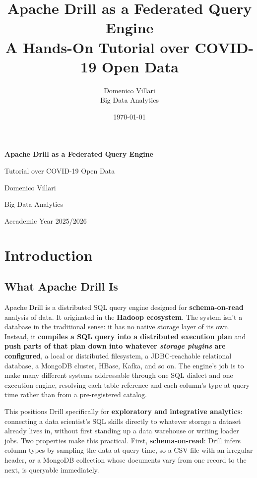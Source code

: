 \documentclass[11pt,a4paper]{article}
\title{\Huge\textbf{Apache Drill as a Federated Query Engine}\\[0.4em]
\Large A Hands-On Tutorial over COVID-19 Open Data}
\author{Domenico Villari\\\small Big Data Analytics}
\date{\today}
\begin{document}
\begin{titlepage}
\centering
\vspace*{3cm}
{\Huge\textbf{Apache Drill as a Federated Query Engine}\par}
\vspace{0.6cm}
{\Large  Tutorial over COVID-19 Open Data\par}
\vspace{2cm}
{\large Domenico Villari\par}
{\normalsize Big Data Analytics \par}
\vspace{3cm}
{\normalsize Accademic Year 2025/2026\par}
\vfill

\end{titlepage}

\tableofcontents
\newpage






\section{Introduction}
\label{sec:intro}

\subsection{What Apache Drill Is}

Apache Drill is a distributed SQL query engine designed for \textbf{schema-on-read}
analysis of data. It originated in the \textbf{Hadoop ecosystem}. 
The system isn't a database in the traditional sense: it has no native storage layer of its own.
Instead, it \textbf{compiles a SQL query into a distributed execution plan} and \textbf{push parts of that plan down into whatever \emph{storage plugins} are configured}, a local or distributed filesystem, a JDBC-reachable relational database, a MongoDB cluster, HBase, Kafka, and so on. The engine's job is to make many different systems addressable through one SQL dialect and one execution engine, resolving each table reference and each column's type at query time rather than from a pre-registered catalog.

This positions Drill specifically for \textbf{exploratory and integrative analytics}: connecting
a data scientist's SQL skills directly to whatever storage a dataset already lives in,
without first standing up a data warehouse or writing loader jobs. Two properties make
this practical.
First, \textbf{schema-on-read}: Drill infers column types by sampling the data
at query time, so a CSV file with an irregular header, or a MongoDB collection whose
documents vary from one record to the next, is queryable immediately. 
\end{document}
